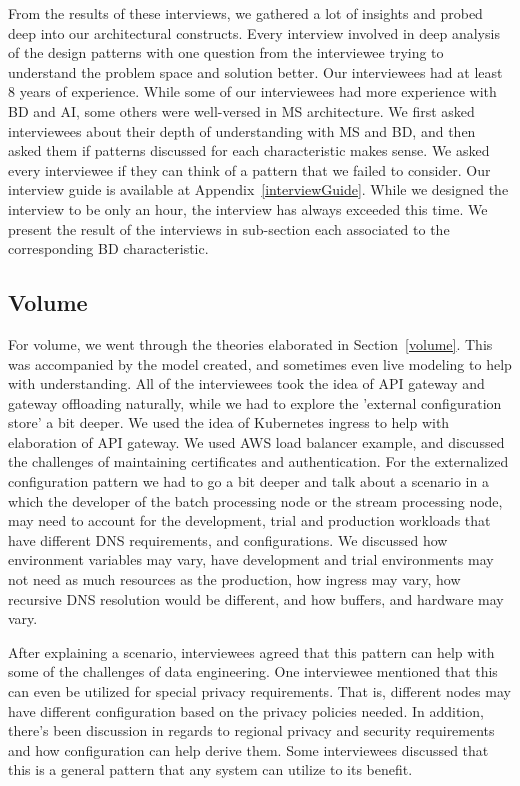 \documentclass{bmcart}
\begin{document}
From the results of these interviews, we gathered a lot of insights and probed deep into our architectural constructs. Every interview involved in deep analysis of the design patterns with one question from the interviewee trying to understand the problem space and solution better. Our interviewees had at least 8 years of experience. While some of our interviewees had more experience with BD and AI, some others were well-versed in MS architecture. We first asked interviewees about their depth of understanding with MS and BD, and then asked them if patterns discussed for each characteristic makes sense. We asked every interviewee if they can think of a pattern that we failed to consider. Our interview guide is available at Appendix~\ref{interviewGuide}. While we designed the interview to be only an hour, the interview has always exceeded this time. We present the result of the interviews in sub-section each associated to the corresponding BD characteristic.



\subsection{Volume}

For volume, we went through the theories elaborated in Section~\ref{volume}. This was accompanied by the model created, and sometimes even live modeling to help with understanding. All of the interviewees took the idea of API gateway and gateway offloading naturally, while we had to explore the 'external configuration store' a bit deeper. We used the idea of Kubernetes ingress to help with elaboration of API gateway. We used AWS load balancer example, and discussed the challenges of maintaining certificates and authentication. For the externalized configuration pattern we had to go a bit deeper and talk about a scenario in a which the developer of the batch processing node or the stream processing node, may need to account for the development, trial and production workloads that have different DNS requirements, and configurations. We discussed how environment variables may vary, have development and trial environments may not need as much resources as the production, how ingress may vary, how recursive DNS resolution would be different, and how buffers, and hardware may vary. 

After explaining a scenario, interviewees agreed that this pattern can help with some of the challenges of data engineering. One interviewee mentioned that this can even be utilized for special privacy requirements. That is, different nodes may have different configuration based on the privacy policies needed. In addition, there's been discussion in regards to regional privacy and security requirements and how configuration can help derive them. Some interviewees discussed that this is a general pattern that any system can utilize to its benefit. 
\end{document}
